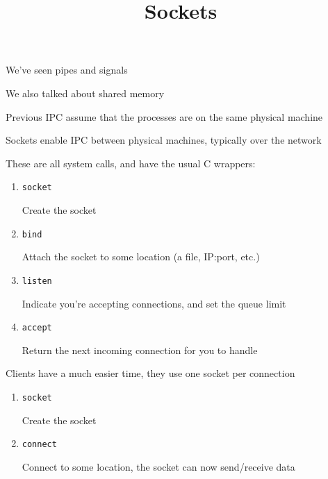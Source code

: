 

\title{Sockets}


  \begin{frame}
    \titlepage
  \end{frame}

  \begin{slide}
    

    We've seen pipes and signals

    \leftspace{}We also talked about shared memory
    \medskip

    Previous IPC assume that the processes are on the same physical
    machine
    \bigskip

    Sockets enable IPC between physical machines, typically over the network

  \end{slide}

  \begin{slide}
    

    These are all system calls, and have the usual C wrappers:

    \begin{enumerate}
      \item \texttt{socket}

        \leftspace{}Create the socket
      \item \texttt{bind}

        \leftspace{}Attach the socket to some location (a file, IP:port, etc.)
      \item \texttt{listen}

        \leftspace{}Indicate you're accepting connections, and set the queue limit
      \item \texttt{accept}

        \leftspace{}Return the next incoming connection for you to handle
    \end{enumerate}

  \end{slide}

  \begin{slide}
    

    Clients have a much easier time, they use one socket per connection

    \begin{enumerate}
      \item \texttt{socket}

        \leftspace{}Create the socket
      \item \texttt{connect}

        \leftspace{}Connect to some location, the socket can now send/receive
                     data
    \end{enumerate}
  \end{slide}

